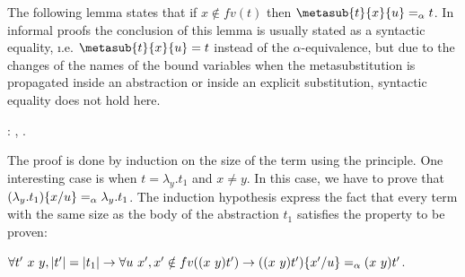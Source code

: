 The following lemma states that if $x \notin fv(t)$ then $\metasub{t}{x}{u} =_\alpha t$. In informal proofs the conclusion of this lemma is usually stated as a syntactic equality, {\i.e.} $\metasub{t}{x}{u} = t$ instead of the $\alpha$-equivalence, but due to the changes of the names of the bound variables when the metasubstitution is propagated inside an abstraction or inside an explicit substitution, syntactic equality does not hold here. 
\begin{coqdoccode}
\coqdocemptyline
\coqdocnoindent
{} : \coqdockw{\ensuremath{\forall}}   ,      \coqref{lambda es.:::'[' x ':=' x ']' x}{\coqdocnotation{[}}  \coqref{lambda es.:::'[' x ':=' x ']' x}{\coqdocnotation{]}}  .\coqdoceol
\end{coqdoccode}
 The proof is done by induction on the size of the term  using the  principle. One interesting case is when $t = \lambda_y.t_1$ and $x \neq y$. In this case, we have to prove that $(\lambda_y.t_1)\{x / u\} =_\alpha \lambda_y.t_1$. The induction hypothesis express the fact that every term with the same size as the body of the abstraction $t_1$ satisfies the property to be proven:


$\forall t'\ x\ y, |t'| = |t_1| \to \forall u\ x', x' \notin fv((x\ y) t') \to ((x\ y) t')\{x' / u\} =_\alpha (x\ y) t'$.


